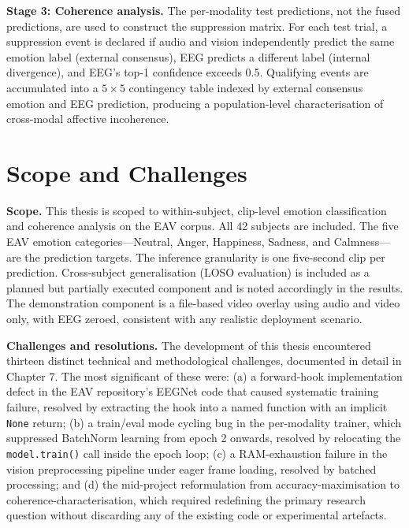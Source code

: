 \textbf{Stage 3: Coherence analysis.} The per-modality test predictions, not the fused predictions, are used to construct the suppression matrix. For each test trial, a suppression event is declared if audio and vision independently predict the same emotion label (external consensus), EEG predicts a different label (internal divergence), and EEG's top-1 confidence exceeds 0.5. Qualifying events are accumulated into a $5\times5$ contingency table indexed by external consensus emotion and EEG prediction, producing a population-level characterisation of cross-modal affective incoherence.

\section{Scope and Challenges}
\textbf{Scope.} This thesis is scoped to within-subject, clip-level emotion classification and coherence analysis on the EAV corpus. All 42 subjects are included. The five EAV emotion categories---Neutral, Anger, Happiness, Sadness, and Calmness---are the prediction targets. The inference granularity is one five-second clip per prediction. Cross-subject generalisation (LOSO evaluation) is included as a planned but partially executed component and is noted accordingly in the results. The demonstration component is a file-based video overlay using audio and video only, with EEG zeroed, consistent with any realistic deployment scenario.

\textbf{Challenges and resolutions.} The development of this thesis encountered thirteen distinct technical and methodological challenges, documented in detail in Chapter 7. The most significant of these were: (a) a forward-hook implementation defect in the EAV repository's EEGNet code that caused systematic training failure, resolved by extracting the hook into a named function with an implicit \texttt{None} return; (b) a train/eval mode cycling bug in the per-modality trainer, which suppressed BatchNorm learning from epoch 2 onwards, resolved by relocating the \texttt{model.train()} call inside the epoch loop; (c) a RAM-exhaustion failure in the vision preprocessing pipeline under eager frame loading, resolved by batched processing; and (d) the mid-project reformulation from accuracy-maximisation to coherence-characterisation, which required redefining the primary research question without discarding any of the existing code or experimental artefacts.
